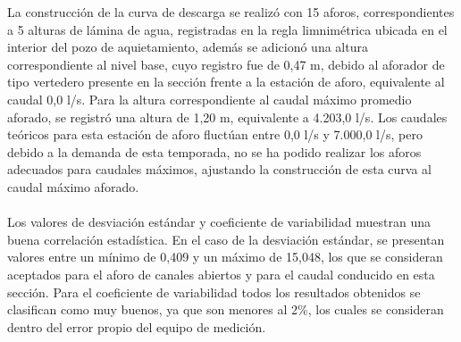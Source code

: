 \documentclass[]{article}
\begin{document}
La construcción de la curva de descarga se realizó con 15 aforos, correspondientes a 5 alturas de lámina de agua, registradas en la regla limnimétrica ubicada en el interior del pozo de aquietamiento, además se adicionó una altura correspondiente al nivel base, cuyo registro fue de 0,47 m, debido al aforador de tipo vertedero presente en la sección frente a la estación de aforo, equivalente al caudal 0,0 l/s. Para la altura correspondiente al caudal máximo promedio aforado, se registró una altura de 1,20 m, equivalente a 4.203,0 l/s. Los caudales teóricos para esta estación de aforo fluctúan entre 0,0 l/s y 7.000,0 l/s, pero debido a la demanda de esta temporada, no se ha podido realizar los aforos adecuados para caudales máximos, ajustando la construcción de esta curva al caudal máximo aforado.\\
\\
Los valores de desviación estándar y coeficiente de variabilidad muestran una buena correlación estadística. En el caso de la desviación estándar, se presentan valores entre un mínimo de 0,409 y un máximo de 15,048, los que se consideran aceptados para el aforo de canales abiertos y para el caudal conducido en esta sección. Para el coeficiente de variabilidad todos los resultados obtenidos se clasifican como muy buenos, ya que son menores al 2\%, los cuales se consideran dentro del error propio del equipo de medición.
\end{document}
